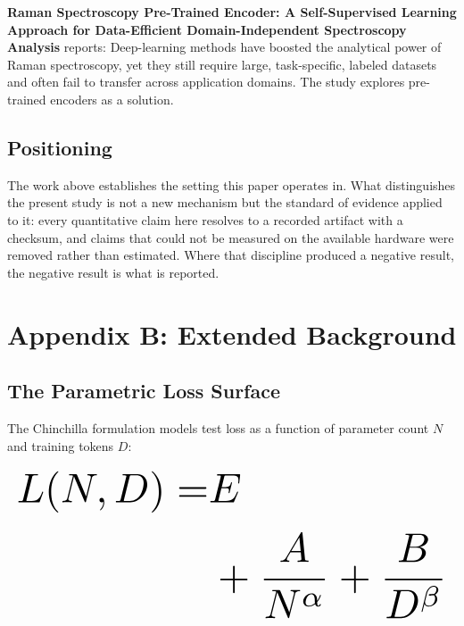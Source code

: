 \documentclass[10pt,journal,compsoc,twocolumn]{IEEEtran}
\begin{document}
\textbf{Raman Spectroscopy Pre-Trained Encoder: A Self-Supervised Learning Approach for Data-Efficient Domain-Independent Spectroscopy Analysis} \cite{doaj_001772c2113c476d9d5d40452c8e10e1} reports: Deep-learning methods have boosted the analytical power of Raman spectroscopy, yet they still require large, task-specific, labeled datasets and often fail to transfer across application domains. The study explores pre-trained encoders as a solution.


\subsection{Positioning}


The work above establishes the setting this paper operates in. What distinguishes the present study is not a new mechanism but the standard of evidence applied to it: every quantitative claim here resolves to a recorded artifact with a checksum, and claims that could not be measured on the available hardware were removed rather than estimated. Where that discipline produced a negative result, the negative result is what is reported.




\section{Appendix B: Extended Background}



\subsection{The Parametric Loss Surface}


The Chinchilla formulation models test loss as a function of parameter count $N$ and training tokens $D$:










\begin{equation}
\resizebox{\columnwidth}{!}{$\displaystyle
\begin{aligned}
L(N, D) = & E \\
& + \frac{A}{N^{\alpha}} + \frac{B}{D^{\beta}}
\end{aligned}
$}
\end{equation}
\end{document}
